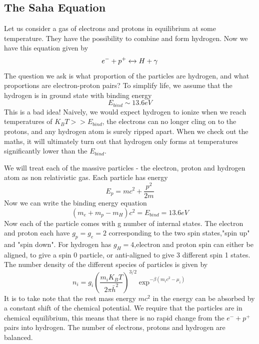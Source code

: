 \documentclass[12pt]{report}
\begin{document}
\subsection{The Saha Equation}
Let us consider a gas of electrons and protons in equilibrium at some temperature. They have the possibility to combine and form hydrogen. Now we have this equation given by
\begin{equation}
e^{-}+p^{+} \xleftrightarrow  \; H+\gamma
\end{equation}
The question we ask is what proportion of the particles are hydrogen, and what proportions are electron-proton pairs? To simplify life, we assume that the hydrogen is in ground state with binding energy 
\begin{equation}
E_{bind} \sim 13.6 eV
\end{equation}
This is a bad idea! Naively, we would expect hydrogen to ionize when we reach temperatures of $K_BT >> E_{bind}$, the electrons can no longer cling on to the protons, and any hydrogen atom is surely ripped apart. When we check out the maths, it will ultimately turn out that hydrogen only forms at temperatures significantly lower than the $E_{bind}$.

We will treat each of the massive particles - the electron, proton and hydrogen atom as non relativistic gas. Each particle has energy
\begin{equation}
E_{p}= mc^2 +  \frac{p^2}{2m}
\end{equation}
Now we can write the binding energy equation
\begin{equation}\label{bindingenergyeq}
(m_e+m_p-m_H)c^2=E_{bind} = 13.6eV
\end{equation}
Now each of the particle comes with g number of internal states. The electron and proton each have $g_p=g_e=2$ corresponding to the two spin states,"spin up" and "spin down". For hydrogen has $g_H=4$,electron and proton spin can either be aligned, to give a spin 0 particle, or anti-aligned to give 3 different spin 1 states.
The number density of the different species of particles is given by
\begin{equation}\label{numberdensity}
n_i=g_i\left(\frac{m_iK_BT}{2 \pi \bar{h}^2}\right)^{3/2} \exp^{-\beta (m_i c^2-\mu_i)}
\end{equation}
It is to take note that the rest mass energy $mc^2$ in the energy can be absorbed by a constant shift of the chemical potential.
We require that the particles are in chemical equilibrium, this means that  there is no rapid change from the $e^- + p^+$ pairs into hydrogen. The number of electrons, protons and hydrogen are balanced. 
\end{document}
